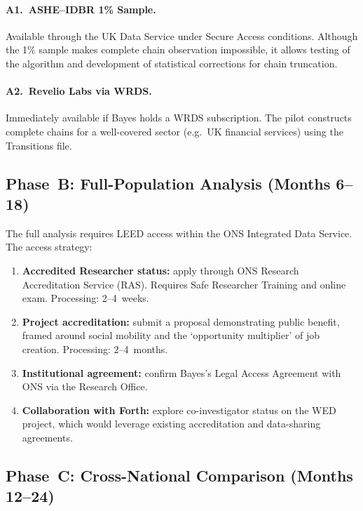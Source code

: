 \documentclass[a4paper]{tufte-handout}
\begin{document}
\paragraph{A1.\ ASHE--IDBR 1\% Sample.}
Available through the UK Data Service under Secure Access conditions. Although the 1\% sample makes complete chain observation impossible, it allows testing of the algorithm and development of statistical corrections for chain truncation.

\paragraph{A2.\ Revelio Labs via WRDS.}
Immediately available if Bayes holds a WRDS subscription. The pilot constructs complete chains for a well-covered sector (e.g.\ UK financial services) using the Transitions file.


\subsection{Phase~B: Full-Population Analysis (Months 6--18)}

The full analysis requires LEED access within the ONS Integrated Data Service. The access strategy:

\begin{enumerate}
	\item \textbf{Accredited Researcher status:} apply through ONS Research Accreditation Service (RAS). Requires Safe Researcher Training and online exam. Processing: 2--4~weeks.
	\item \textbf{Project accreditation:} submit a proposal demonstrating public benefit, framed around social mobility and the `opportunity multiplier' of job creation. Processing: 2--4~months.
	\item \textbf{Institutional agreement:} confirm Bayes's Legal Access Agreement with ONS via the Research Office.
	\item \textbf{Collaboration with Forth:} explore co-investigator status on the WED project, which would leverage existing accreditation and data-sharing agreements.
\end{enumerate}


\subsection{Phase~C: Cross-National Comparison (Months 12--24)}
\end{document}
